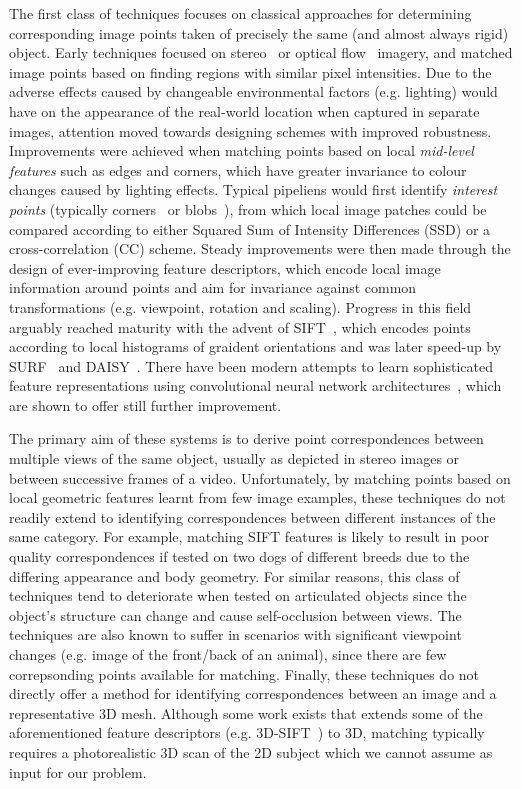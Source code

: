 The first class of techniques focuses on classical approaches for determining corresponding image points taken of precisely the same (and almost always rigid) object. Early techniques focused on stereo~\cite{point-corres-stereo} or optical flow~\cite{point-corres-opticalflow} imagery, and matched image points based on finding regions with similar pixel intensities. Due to the adverse effects caused by changeable environmental factors (e.g. lighting) would have on the appearance of the real-world location when captured in separate images, attention moved towards designing schemes with improved robustness. Improvements were achieved when matching points based on local \emph{mid-level features} such as edges and corners, which have greater invariance to colour changes caused by lighting effects. Typical pipeliens would first identify \emph{interest points} (typically corners~\cite{corner-moravec,corner-harris,corner-susan} or blobs~\cite{sift}), from which local image patches could be compared according to either Squared Sum of Intensity Differences (SSD) or a cross-correlation (CC) scheme. Steady improvements were then made through the design of ever-improving feature descriptors, which encode local image information around points and aim for invariance against common transformations (e.g. viewpoint, rotation and scaling). Progress in this field arguably reached maturity with the advent of SIFT~\cite{sift}, which encodes points according to local histograms of graident orientations and was later speed-up by SURF~\cite{surf} and DAISY~\cite{daisy}. There have been modern attempts to learn sophisticated feature representations using convolutional neural network architectures~\cite{lift, matchnet}, which are shown to offer still further improvement.

The primary aim of these systems is to derive point correspondences between multiple views of the same object, usually as depicted in stereo images or between successive frames of a video. Unfortunately, by matching points based on local geometric features learnt from few image examples, these techniques do not readily extend to identifying correspondences between different instances of the same category. For example, matching SIFT features is likely to result in poor quality correspondences if tested on two dogs of different breeds due to the differing appearance and body geometry. For similar reasons, this class of techniques tend to deteriorate when tested on articulated objects since the object's structure can change and cause self-occlusion between views. The techniques are also known to suffer in scenarios with significant viewpoint changes (e.g. image of the front/back of an animal), since there are few correpsonding points available for matching. Finally, these techniques do not directly offer a method for identifying correspondences between an image and a representative 3D mesh. Although some work exists that extends some of the aforementioned feature descriptors (e.g. 3D-SIFT~\cite{sift-3d}) to 3D, matching typically requires a photorealistic 3D scan of the 2D subject which we cannot assume as input for our problem.

